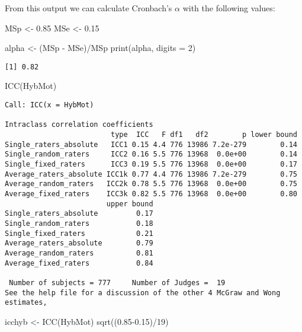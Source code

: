 \documentclass[
]{book}
\newenvironment{Shaded}{\begin{snugshade}}{\end{snugshade}}
\newcommand{\AttributeTok}[1]{\textcolor[rgb]{0.77,0.63,0.00}{#1}}
\newcommand{\DecValTok}[1]{\textcolor[rgb]{0.00,0.00,0.81}{#1}}
\newcommand{\FloatTok}[1]{\textcolor[rgb]{0.00,0.00,0.81}{#1}}
\newcommand{\FunctionTok}[1]{\textcolor[rgb]{0.00,0.00,0.00}{#1}}
\newcommand{\NormalTok}[1]{#1}
\newcommand{\OtherTok}[1]{\textcolor[rgb]{0.56,0.35,0.01}{#1}}
\newcommand{\SpecialCharTok}[1]{\textcolor[rgb]{0.00,0.00,0.00}{#1}}
\begin{document}
From this output we can calculate Cronbach's \(\alpha\) with the following values:

\begin{Shaded}
\begin{Highlighting}[]
\NormalTok{MSp }\OtherTok{\textless{}{-}} \FloatTok{0.85}
\NormalTok{MSe }\OtherTok{\textless{}{-}} \FloatTok{0.15}

\NormalTok{alpha }\OtherTok{\textless{}{-}}\NormalTok{ (MSp }\SpecialCharTok{{-}}\NormalTok{ MSe)}\SpecialCharTok{/}\NormalTok{MSp}
\FunctionTok{print}\NormalTok{(alpha, }\AttributeTok{digits =} \DecValTok{2}\NormalTok{)}
\end{Highlighting}
\end{Shaded}

\begin{verbatim}
[1] 0.82
\end{verbatim}

\begin{Shaded}
\begin{Highlighting}[]
\FunctionTok{ICC}\NormalTok{(HybMot)}
\end{Highlighting}
\end{Shaded}

\begin{verbatim}
Call: ICC(x = HybMot)

Intraclass correlation coefficients 
                         type  ICC   F df1   df2        p lower bound
Single_raters_absolute   ICC1 0.15 4.4 776 13986 7.2e-279        0.14
Single_random_raters     ICC2 0.16 5.5 776 13968  0.0e+00        0.14
Single_fixed_raters      ICC3 0.19 5.5 776 13968  0.0e+00        0.17
Average_raters_absolute ICC1k 0.77 4.4 776 13986 7.2e-279        0.75
Average_random_raters   ICC2k 0.78 5.5 776 13968  0.0e+00        0.75
Average_fixed_raters    ICC3k 0.82 5.5 776 13968  0.0e+00        0.80
                        upper bound
Single_raters_absolute         0.17
Single_random_raters           0.18
Single_fixed_raters            0.21
Average_raters_absolute        0.79
Average_random_raters          0.81
Average_fixed_raters           0.84

 Number of subjects = 777     Number of Judges =  19
See the help file for a discussion of the other 4 McGraw and Wong estimates,
\end{verbatim}

\begin{Shaded}
\begin{Highlighting}[]
\NormalTok{icchyb }\OtherTok{\textless{}{-}} \FunctionTok{ICC}\NormalTok{(HybMot)}
\FunctionTok{sqrt}\NormalTok{((}\FloatTok{0.85{-}0.15}\NormalTok{)}\SpecialCharTok{/}\DecValTok{19}\NormalTok{)}
\end{Highlighting}
\end{Shaded}
\end{document}
